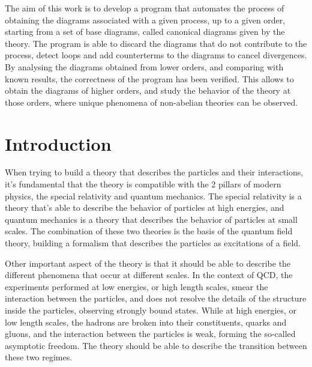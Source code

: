 \documentclass[11pt,a4paper,twoside,pdf]{article}
\numberwithin{equation}{section}
\begin{document}
\begin{center}
\begin{minipage}{0.8\linewidth}
The aim of this work is to develop a program that automates the process of
obtaining the diagrams associated with a given process, up to a given order,
starting from a set of base diagrams, called canonical diagrams given by the
theory. The program is able to discard the diagrams that do not contribute to the
process, detect loops and add counterterms to the diagrams to cancel divergences. \\

By analysing the diagrams obtained from lower orders, and comparing with known
results, the correctness of the program has been verified. This allows to obtain
the diagrams of higher orders, and study the behavior of the theory at those
orders, where unique phenomena of non-abelian theories can be observed.

\end{minipage}

\newpage

\end{center}


\pagestyle{empty}       %
\tableofcontents
\setcounter{page}{0}
\cleardoublepage        %


\pagestyle{fancy}
\fancyhead[RO,LE]{\leftmark}
\fancyhead[LO,RE]{\thepage}
\fancyfoot{}

\newpage

\section{Introduction}

When trying to build a theory that describes the particles and their interactions, 
it's fundamental that the theory is compatible with the 2 pillars of modern physics,
the special relativity and quantum mechanics. The special relativity is a theory 
that's able to describe the behavior of particles at high energies, and quantum 
mechanics is a theory that describes the behavior of particles at small scales.
The combination of these two theories is the basis of the quantum field theory,
building a formalism that describes the particles as excitations of a field.

Other important aspect of the theory is that it should be able to describe the 
different phenomena that occur at different scales. In the context of QCD, the 
experiments performed at low energies, or high length scales, smear the interaction
between the particles, and does not resolve the details of the structure inside the
particles, observing strongly bound states. While at high energies, or low length 
scales, the hadrons are broken into their constituents, quarks and gluons, and the 
interaction between the particles is weak, forming the so-called asymptotic freedom.
The theory should be able to describe the transition between these two regimes.
\end{document}
